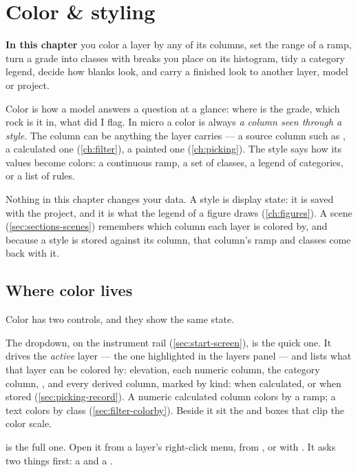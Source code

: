 \chapter{Color \& styling}\label{ch:color}
\begin{goals}
\textbf{In this chapter} you color a layer by any of its columns, set the range of a ramp, turn a grade into classes with breaks you place on its histogram, tidy a category legend, decide how blanks look, and carry a finished look to another layer, model or project.
\end{goals}

Color is how a model answers a question at a glance: where is the grade, which rock is it in, what did I flag. In micro a color is always \emph{a column seen through a style}. The column can be anything the layer carries — a source column such as , a calculated one (\cref{ch:filter}), a painted one (\cref{ch:picking}). The style says how its values become colors: a continuous ramp, a set of classes, a legend of categories, or a list of rules.

Nothing in this chapter changes your data. A style is display state: it is saved with the project, and it is what the legend of a figure draws (\cref{ch:figures}). A scene (\cref{sec:sections-scenes}) remembers which column each layer is colored by, and because a style is stored against its column, that column's ramp and classes come back with it.

\section{Where color lives}\label{sec:color-where}
Color has two controls, and they show the same state.

The  dropdown, on the instrument rail (\cref{sec:start-screen}), is the quick one. It drives the \emph{active} layer — the one highlighted in the layers panel — and lists what that layer can be colored by: elevation, each numeric column, the category column, , and every derived column, marked by kind:  when calculated,  or \code{\%} when stored (\cref{sec:picking-record}). A numeric calculated column colors by a ramp; a text  colors by class (\cref{sec:filter-colorby}). Beside it sit the  and  boxes that clip the color scale.

 is the full one. Open it from a layer's right-click menu, from , or with . It asks two things first: a  and a .

